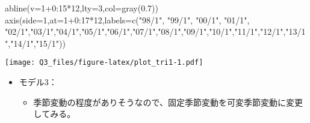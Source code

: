 \documentclass[]{article}
\newenvironment{Shaded}{\begin{snugshade}}{\end{snugshade}}
\newcommand{\AttributeTok}[1]{\textcolor[rgb]{0.77,0.63,0.00}{#1}}
\newcommand{\DecValTok}[1]{\textcolor[rgb]{0.00,0.00,0.81}{#1}}
\newcommand{\FloatTok}[1]{\textcolor[rgb]{0.00,0.00,0.81}{#1}}
\newcommand{\FunctionTok}[1]{\textcolor[rgb]{0.00,0.00,0.00}{#1}}
\newcommand{\NormalTok}[1]{#1}
\newcommand{\SpecialCharTok}[1]{\textcolor[rgb]{0.00,0.00,0.00}{#1}}
\newcommand{\StringTok}[1]{\textcolor[rgb]{0.31,0.60,0.02}{#1}}
\providecommand{\tightlist}{%
  \setlength{\itemsep}{0pt}\setlength{\parskip}{0pt}}
\begin{document}
\begin{Shaded}
\begin{Highlighting}[]
\FunctionTok{abline}\NormalTok{(}\AttributeTok{v=}\DecValTok{1}\SpecialCharTok{+}\DecValTok{0}\SpecialCharTok{:}\DecValTok{15}\SpecialCharTok{*}\DecValTok{12}\NormalTok{,}\AttributeTok{lty=}\DecValTok{3}\NormalTok{,}\AttributeTok{col=}\FunctionTok{gray}\NormalTok{(}\FloatTok{0.7}\NormalTok{))}
\FunctionTok{axis}\NormalTok{(}\AttributeTok{side=}\DecValTok{1}\NormalTok{,}\AttributeTok{at=}\DecValTok{1}\SpecialCharTok{+}\DecValTok{0}\SpecialCharTok{:}\DecValTok{17}\SpecialCharTok{*}\DecValTok{12}\NormalTok{,}\AttributeTok{labels=}\FunctionTok{c}\NormalTok{(}\StringTok{"98/1"}\NormalTok{, }\StringTok{"99/1"}\NormalTok{, }\StringTok{"00/1"}\NormalTok{, }\StringTok{"01/1"}\NormalTok{, }\StringTok{"02/1"}\NormalTok{,}\StringTok{"03/1"}\NormalTok{,}\StringTok{"04/1"}\NormalTok{,}\StringTok{"05/1"}\NormalTok{,}\StringTok{"06/1"}\NormalTok{,}\StringTok{"07/1"}\NormalTok{,}\StringTok{"08/1"}\NormalTok{,}\StringTok{"09/1"}\NormalTok{,}\StringTok{"10/1"}\NormalTok{,}\StringTok{"11/1"}\NormalTok{,}\StringTok{"12/1"}\NormalTok{,}\StringTok{"13/1"}\NormalTok{,}\StringTok{"14/1"}\NormalTok{,}\StringTok{"15/1"}\NormalTok{))}
\end{Highlighting}
\end{Shaded}

\texttt{[image: Q3\_files/figure-latex/plot\_tri1-1.pdf]}

\begin{itemize}
\tightlist
\item
  モデル3：

  \begin{itemize}
  \tightlist
  \item
    季節変動の程度がありそうなので、固定季節変動を可変季節変動に変更してみる。
  \end{itemize}
\end{itemize}
\end{document}
